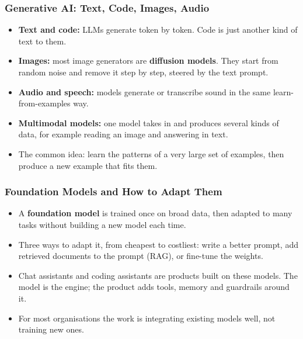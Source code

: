\begin{frame}[fragile]\frametitle{Generative AI: Text, Code, Images, Audio}
\begin{itemize}
\item \textbf{Text and code:} LLMs generate token by token. Code is just another kind of text to them.
\item \textbf{Images:} most image generators are \textbf{diffusion models}. They start from random noise and remove it step by step, steered by the text prompt.
\item \textbf{Audio and speech:} models generate or transcribe sound in the same learn-from-examples way.
\item \textbf{Multimodal models:} one model takes in and produces several kinds of data, for example reading an image and answering in text.
\item The common idea: learn the patterns of a very large set of examples, then produce a new example that fits them.
\end{itemize}
\end{frame}

\begin{frame}[fragile]\frametitle{Foundation Models and How to Adapt Them}
\begin{itemize}
\item A \textbf{foundation model} is trained once on broad data, then adapted to many tasks without building a new model each time.
\item Three ways to adapt it, from cheapest to costliest: write a better prompt, add retrieved documents to the prompt (RAG), or fine-tune the weights.
\item Chat assistants and coding assistants are products built on these models. The model is the engine; the product adds tools, memory and guardrails around it.
\item For most organisations the work is integrating existing models well, not training new ones.
\end{itemize}
\end{frame}
